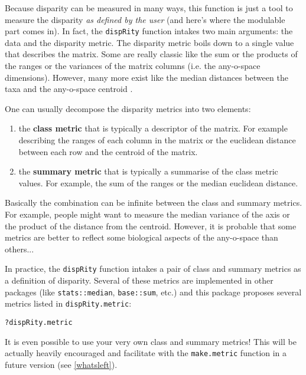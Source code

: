 \documentclass{article}\usepackage[]{graphicx}\usepackage[]{color}
\makeatletter
\newcommand{\hlopt}[1]{\textcolor[rgb]{0,0,0}{#1}}%
\newcommand{\hlstd}[1]{\textcolor[rgb]{0.345,0.345,0.345}{#1}}%
\newenvironment{kframe}{%
 \def\at@end@of@kframe{}%
 \ifinner\ifhmode%
  \def\at@end@of@kframe{\end{minipage}}%
  \begin{minipage}{\columnwidth}%
 \fi\fi%
 \def\FrameCommand##1{\hskip\@totalleftmargin \hskip-\fboxsep
 \colorbox{shadecolor}{##1}\hskip-\fboxsep
     \hskip-\linewidth \hskip-\@totalleftmargin \hskip\columnwidth}%
 \MakeFramed {\advance\hsize-\width
   \@totalleftmargin\z@ \linewidth\hsize
   \@setminipage}}%
 {\par\unskip\endMakeFramed%
 \at@end@of@kframe}
\newenvironment{knitrout}{}{} %
\newcommand{\dispRity}{\texttt{dispRity} }
\makeatother
\begin{document}
Because disparity can be measured in many ways, this function is just a tool to measure the disparity \textit{as defined by the user} (and here's where the modulable part comes in).
In fact, the \dispRity function intakes two main arguments: the data and the disparity metric.
The disparity metric boils down to a single value that describes the matrix.
Some are really classic like the sum or the products of the ranges or the variances of the matrix columns \cite{Wills1994} (i.e. the any-o-space dimensions).
However, many more exist like the median distances between the taxa and the any-o-space centroid \cite{GuillermeSTD}.

One can usually decompose the disparity metrics into two elements:
\begin{enumerate}
\item the \textbf{class metric} that is typically a descriptor of the matrix. For example describing the ranges of each column in the matrix or the euclidean distance between each row and the centroid of the matrix.
\item the \textbf{summary metric} that is typically a summarise of the class metric values. For example, the sum of the ranges or the median euclidean distance. 
\end{enumerate}
Basically the combination can be infinite between the class and summary metrics.
For example, people might want to measure the median variance of the axis or the product of the distance from the centroid.
However, it is probable that some metrics are better to reflect some biological aspects of the any-o-space than others...

In practice, the \dispRity function intakes a pair of class and summary metrics as a definition of disparity.
Several of these metrics are implemented in other packages (like \texttt{stats::median}, \texttt{base::sum}, etc.) and this package proposes several metrics listed in \texttt{dispRity.metric}:

\begin{knitrout}
\color{fgcolor}\begin{kframe}
\begin{alltt}
\hlopt{?}\hlstd{dispRity.metric}
\end{alltt}
\end{kframe}
\end{knitrout}

It is even possible to use your very own class and summary metrics!
This will be actually heavily encouraged and facilitate with the \texttt{make.metric} function in a future version (see \ref{whatsleft}).
\end{document}
